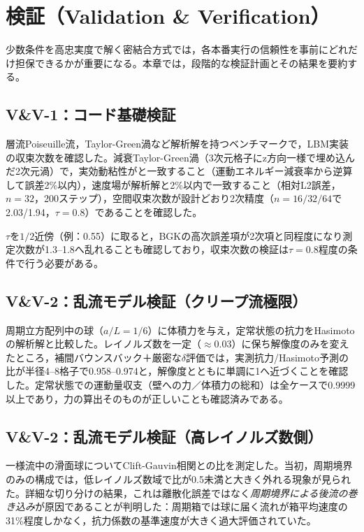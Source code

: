 \section{検証（Validation \& Verification）}
\label{sec:validation}

少数条件を高忠実度で解く密結合方式では，各本番実行の信頼性を事前にどれだけ担保できるかが重要になる。本章では，段階的な検証計画とその結果を要約する。

\subsection{V\&V-1：コード基礎検証}

層流Poiseuille流，Taylor-Green渦など解析解を持つベンチマークで，LBM実装の収束次数を確認した。減衰Taylor-Green渦（3次元格子にz方向一様で埋め込んだ2次元渦）で，実効動粘性がと一致すること（運動エネルギー減衰率から逆算して誤差2\%以内），速度場が解析解と2\%以内で一致すること（相対L2誤差，\(n=32\)，200ステップ），空間収束次数が設計どおり2次精度（\(n=16/32/64\)で2.03/1.94，\(\tau=0.8\)）であることを確認した。

\(\tau\)を\(1/2\)近傍（例：0.55）に取ると，BGKの高次誤差項が2次項と同程度になり測定次数が1.3--1.8へ乱れることも確認しており，収束次数の検証は\(\tau=0.8\)程度の条件で行う必要がある。

\subsection{V\&V-2：乱流モデル検証（クリープ流極限）}

周期立方配列中の球（\(a/L=1/6\)）に体積力を与え，定常状態の抗力をHasimotoの解析解と比較した。レイノルズ数を一定（\(\approx0.03\)）に保ち解像度のみを変えたところ，補間バウンスバック＋厳密な\(\delta\)評価では，実測抗力/Hasimoto予測の比が半径4--8格子で0.958--0.974と，解像度とともに単調に1へ近づくことを確認した。定常状態での運動量収支（壁への力／体積力の総和）は全ケースで0.9999以上であり，力の算出そのものが正しいことも確認済みである。

\subsection{V\&V-2：乱流モデル検証（高レイノルズ数側）}
\label{sec:validation-highre}

一様流中の滑面球についてClift-Gauvin相関との比を測定した。当初，周期境界のみの構成では，低レイノルズ数域で比が0.5未満と大きく外れる現象が見られた。詳細な切り分けの結果，これは離散化誤差ではなく\emph{周期境界による後流の巻き込み}が原因であることが判明した：周期箱では球に届く流れが箱平均速度の31\%程度しかなく，抗力係数の基準速度が大きく過大評価されていた。

